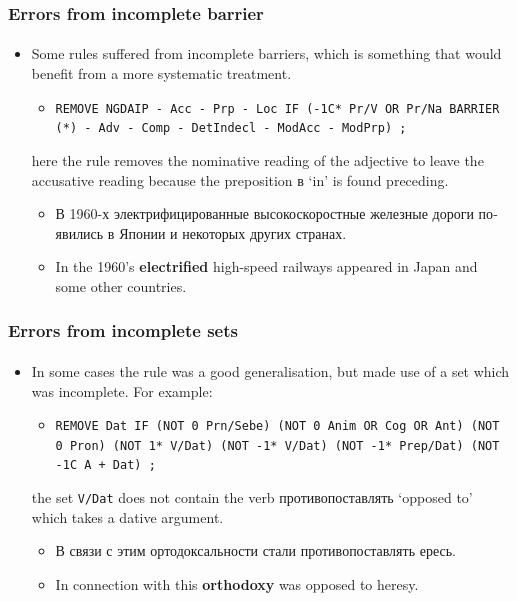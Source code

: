 \documentclass{beamer}
\newcommand{\rus}[1]{\foreignlanguage{russian}{#1}}
\begin{document}
\begin{frame}
\frametitle{Errors from incomplete barrier}
\framesubtitle{}
\begin{itemize}
	\item Some rules suffered from incomplete barriers, which is something that would
	benefit from a more systematic treatment.
	\begin{itemize} 
		\item \texttt{REMOVE NGDAIP - Acc - Prp - Loc IF (-1C* Pr/V OR Pr/Na BARRIER (*) - Adv - Comp - DetIndecl - ModAcc - ModPrp) ;}
	\end{itemize}
	here the rule removes the nominative reading of the adjective to leave the accusative 
	reading because the preposition \rus{в} `in' is found preceding. 
	\begin{itemize}
     \item \rus{В 1960-х электрифицированные высокоскоростные железные дороги появились в Японии и некоторых других странах.}
     \item In the 1960's \textbf{electrified} high-speed railways appeared in Japan and some other countries.
   \end{itemize}
\end{itemize}
\end{frame}

\begin{frame}
\frametitle{Errors from incomplete sets}
\framesubtitle{}
\begin{itemize}
	\item In some cases the rule was a good generalisation, but made use of a set
	which was incomplete. For example:
	\begin{itemize}
		\item \texttt{REMOVE Dat IF (NOT 0 Prn/Sebe) (NOT 0 Anim OR Cog OR Ant) (NOT 0 Pron) (NOT 1* V/Dat) (NOT -1* V/Dat) (NOT -1* Prep/Dat) (NOT -1C A + Dat) ;}
	\end{itemize} 
	the set \texttt{V/Dat} does not contain the verb \rus{противопоставлять} `opposed to' which takes 
	a dative argument.
	\begin{itemize}
		\item \rus{В связи с этим ортодоксальности стали противопоставлять ересь.}
		\item In connection with this \textbf{orthodoxy} was opposed to heresy. 
	\end{itemize}
\end{itemize}
\end{frame}
\end{document}
